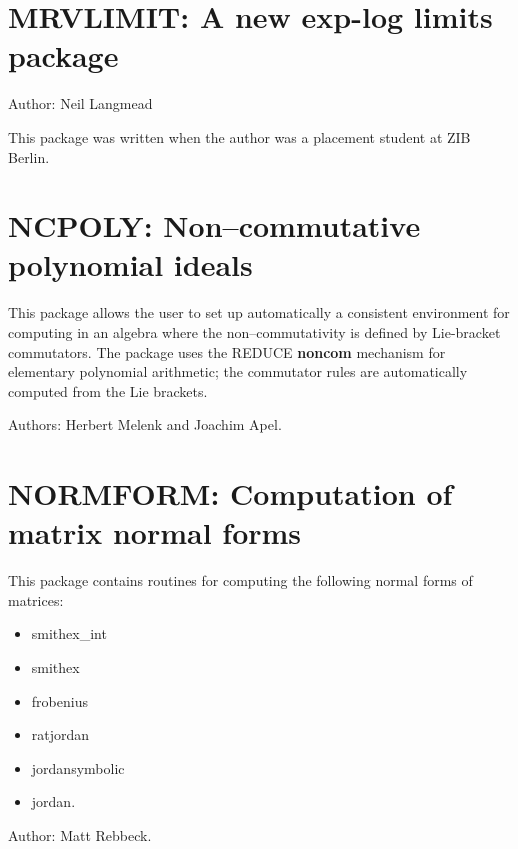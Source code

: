 \newpage

\section{MRVLIMIT: A new exp-log limits package}

Author: Neil Langmead

This package was written when the author was a placement student at ZIB Berlin.



\section{NCPOLY: Non--commutative polynomial ideals}

This package allows the user to set up automatically a consistent
environment for computing in an algebra where the non--commutativity is
defined by Lie-bracket commutators.  The package uses the {REDUCE} {\bf
noncom} mechanism for elementary polynomial arithmetic; the commutator
rules are automatically computed from the Lie brackets.

Authors: Herbert Melenk and Joachim Apel.



\newpage

\section{NORMFORM: Computation of matrix normal forms} 
\label{NORMFORM}

This package contains routines for computing the following
normal forms of matrices:
\begin{itemize}
\item smithex\_int
\item smithex
\item frobenius
\item ratjordan
\item jordansymbolic
\item jordan.
\end{itemize}

Author: Matt Rebbeck.



\newpage

